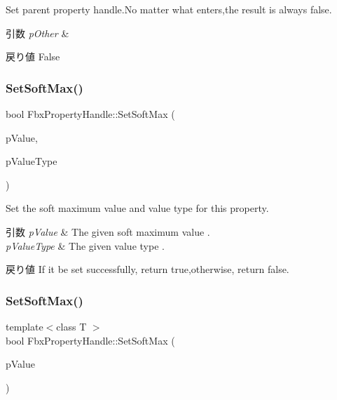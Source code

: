 Set parent property handle.\+No matter what enters,the result is always false. 
\begin{DoxyParams}{引数}
{\em p\+Other} & \\
\hline
\end{DoxyParams}
\begin{DoxyReturn}{戻り値}
False 
\end{DoxyReturn}
\mbox{\label{class_fbx_property_handle_ad4303ec2be34fb9d619fc98e68486784}} 
\subsubsection{\texorpdfstring{Set\+Soft\+Max()}{SetSoftMax()}\hspace{0.1cm}{\footnotesize\ttfamily [1/2]}}
{\footnotesize\ttfamily bool Fbx\+Property\+Handle\+::\+Set\+Soft\+Max (\begin{DoxyParamCaption}\item[{const void $\ast$}]{p\+Value,  }\item[{\hyperlink{fbxpropertytypes_8h_a73913a5ddfb20e57c6f25e9e6784bd92}{E\+Fbx\+Type}}]{p\+Value\+Type }\end{DoxyParamCaption})}

Set the soft maximum value and value type for this property. 
\begin{DoxyParams}{引数}
{\em p\+Value} & The given soft maximum value . \\
\hline
{\em p\+Value\+Type} & The given value type . \\
\hline
\end{DoxyParams}
\begin{DoxyReturn}{戻り値}
If it be set successfully, return true,otherwise, return false. 
\end{DoxyReturn}
\mbox{\label{class_fbx_property_handle_a2581fff85d3c2e73c99d16f2b9c1a66e}} 
\subsubsection{\texorpdfstring{Set\+Soft\+Max()}{SetSoftMax()}\hspace{0.1cm}{\footnotesize\ttfamily [2/2]}}
{\footnotesize\ttfamily template$<$class T $>$ \\
bool Fbx\+Property\+Handle\+::\+Set\+Soft\+Max (\begin{DoxyParamCaption}\item[{const T \&}]{p\+Value }\end{DoxyParamCaption})}

